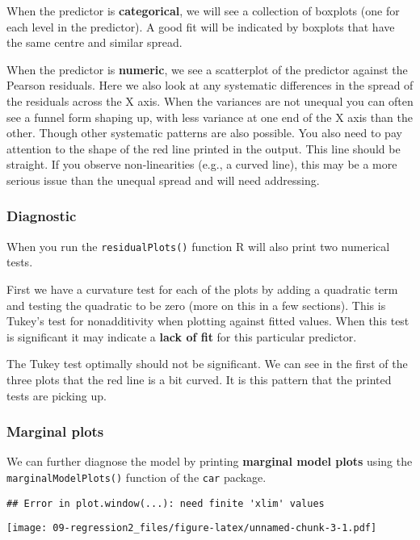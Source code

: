\documentclass[
]{book}
\begin{document}
When the predictor is \textbf{categorical}, we will see a collection of boxplots (one for each level in the predictor). A good fit will be indicated by boxplots that have the same centre and similar spread.

When the predictor is \textbf{numeric}, we see a scatterplot of the predictor against the Pearson residuals. Here we also look at any systematic differences in the spread of the residuals across the X axis. When the variances are not unequal you can often see a funnel form shaping up, with less variance at one end of the X axis than the other. Though other systematic patterns are also possible. You also need to pay attention to the shape of the red line printed in the output. This line should be straight. If you observe non-linearities (e.g., a curved line), this may be a more serious issue than the unequal spread and will need addressing.

\subsubsection{Diagnostic}\label{diagnostic}

When you run the \texttt{residualPlots()} function R will also print two numerical tests.

First we have a curvature test for each of the plots by adding a quadratic term and testing the quadratic to be zero (more on this in a few sections). This is Tukey's test for nonadditivity when plotting against fitted values. When this test is significant it may indicate a \textbf{lack of fit} for this particular predictor.

The Tukey test optimally should not be significant. We can see in the first of the three plots that the red line is a bit curved. It is this pattern that the printed tests are picking up.

\subsubsection{Marginal plots}\label{marginal-plots}

We can further diagnose the model by printing \textbf{marginal model plots} using the \texttt{marginalModelPlots()} function of the \texttt{car} package.

\begin{verbatim}
## Error in plot.window(...): need finite 'xlim' values
\end{verbatim}

\texttt{[image: 09-regression2\_files/figure-latex/unnamed-chunk-3-1.pdf]}
\end{document}
